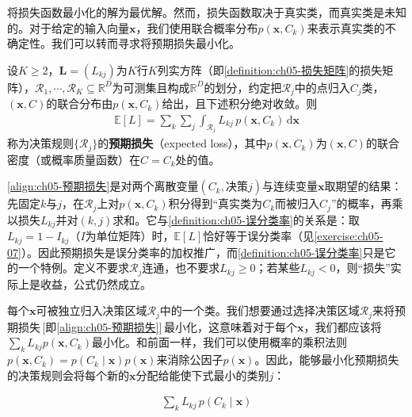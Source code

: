 \documentclass[../../main.tex]{subfiles}
\begin{document}
将损失函数最小化的解为最优解。然而，损失函数取决于真实类，而真实类是未知的。对于给定的输入向量$\boldsymbol{x}$，我们使用联合概率分布$p(\boldsymbol{x},C_k)$来表示真实类的不确定性。我们可以转而寻求将预期损失最小化。

\begin{definition}[预期损失]\label{definition:ch05-预期损失}
设$K\geqslant2$，$\boldsymbol{L}=(L_{kj})$为$K$行$K$列实方阵（即\cref{definition:ch05-损失矩阵}的损失矩阵），$\mathcal{R}_1,\cdots,\mathcal{R}_K\subseteq\mathbb{R}^{D}$为可测集且构成$\mathbb{R}^{D}$的划分，约定把$\mathcal{R}_j$中的点归入$C_j$类，$(\boldsymbol{x},C)$的联合分布由$p(\boldsymbol{x},C_k)$给出，且下述积分绝对收敛。则
\begin{align}
  \mathbb{E}[L]=\sum_{k}\sum_{j}\int_{\mathcal{R}_j}L_{kj}\,p(\boldsymbol{x},C_k)\,\mathrm{d}\boldsymbol{x}
  \label{align:ch05-预期损失}
\end{align}
称为决策规则$\{\mathcal{R}_j\}$的\textbf{预期损失}（expected loss），其中$p(\boldsymbol{x},C_k)$为$(\boldsymbol{x},C)$的联合密度（或概率质量函数）在$C=C_k$处的值。
\end{definition}

\begin{remark}
\eqref{align:ch05-预期损失}是对两个离散变量$(C_k,\text{决策}j)$与连续变量$\boldsymbol{x}$取期望的结果：先固定$k$与$j$，在$\mathcal{R}_j$上对$p(\boldsymbol{x},C_k)$积分得到“真实类为$C_k$而被归入$C_j$”的概率，再乘以损失$L_{kj}$并对$(k,j)$求和。它与\cref{definition:ch05-误分类率}的关系是：取$L_{kj}=1-I_{kj}$（$I$为单位矩阵）时，$\mathbb{E}[L]$恰好等于误分类率（见\cref{exercise:ch05-07}）。因此预期损失是误分类率的加权推广，而\cref{definition:ch05-误分类率}只是它的一个特例。定义不要求$\mathcal{R}_j$连通，也不要求$L_{kj}\geqslant 0$；若某些$L_{kj}<0$，则“损失”实际上是收益，公式仍然成立。
\end{remark}

每个$\boldsymbol{x}$可被独立归入决策区域$\mathcal{R}_j$中的一个类。我们想要通过选择决策区域$\mathcal{R}_j$来将预期损失\,[即\eqref{align:ch05-预期损失}]\,最小化，这意味着对于每个$\boldsymbol{x}$，我们都应该将$\sum_k L_{kj}p(\boldsymbol{x},C_k)$最小化。和前面一样，我们可以使用概率的乘积法则$p(\boldsymbol{x},C_k)=p(C_k\mid\boldsymbol{x})p(\boldsymbol{x})$来消除公因子$p(\boldsymbol{x})$。因此，能够最小化预期损失的决策规则会将每个新的$\boldsymbol{x}$分配给能使下式最小的类别$j$：

\begin{align}
  \sum_{k}L_{kj}\,p(C_k\mid\boldsymbol{x})
  \label{align:ch05-最小风险}
\end{align}
\end{document}
